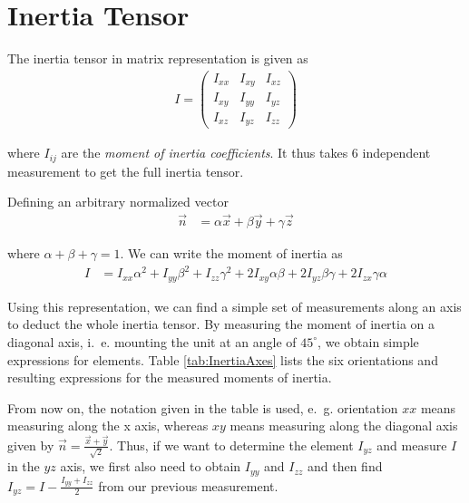 \documentclass[journal]{IEEEtran}
\begin{document}
\section{Inertia Tensor}

The inertia tensor in matrix representation is given as
\begin{align}
	I = 
	\begin{pmatrix}
		I_{xx} & I_{xy} & I_{xz} \\
		I_{xy} & I_{yy} & I_{yz} \\
		I_{xz} & I_{yz} & I_{zz}
	\end{pmatrix}
\end{align}

where $I_{ij}$ are the \emph{moment of inertia coefficients}.
It thus takes 6 independent measurement to get the full inertia tensor.

Defining an arbitrary normalized vector
\begin{align}
	\vec{n} & = \alpha \vec{x} + \beta \vec{y} + \gamma \vec{z}
\end{align}

where $\alpha + \beta + \gamma = 1$.
We can write the moment of inertia as \cite{book:goldstein}
\begin{align}
	I & = I_{xx} \alpha^2 + I_{yy} \beta^2 + I_{zz} \gamma^2 + 2 I_{xy} \alpha \beta + 2 I_{yz} \beta \gamma + 2 I_{zx} \gamma \alpha
\end{align}

Using this representation, we can find a simple set of measurements along an axis to deduct the whole inertia tensor.
By measuring the moment of inertia on a diagonal axis, i.~e. mounting the unit at an angle of $45^{\circ}$, we obtain simple expressions for elements.
Table \ref{tab:InertiaAxes} lists the six orientations and resulting expressions for the measured moments of inertia.

From now on, the notation given in the table is used, e.~g. orientation $xx$ means measuring along the x axis, whereas $xy$ means measuring along the diagonal axis given by $\vec{n} = \frac{\vec{x} + \vec{y}}{\sqrt{2}}$.
Thus, if we want to determine the element $I_{yz}$ and measure $I$ in the $yz$ axis, we first also need to obtain $I_{yy}$ and $I_{zz}$ and then find $I_{yz} = I - \frac{I_{yy} + I_{zz}}{2}$ from our previous measurement.
\end{document}
